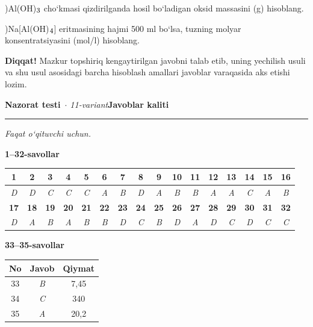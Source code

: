\documentclass[11pt,a4paper]{article}
\renewcommand{\textsubscript}[1]{\ensuremath{_{\text{\fontsize{8}{8}\selectfont #1}}}}
\newcommand{\diqqat}[1]{\par\smallskip\noindent\textbf{Diqqat!} #1\par\medskip}
\begin{document}
)Al(OH)\textsubscript{3} cho`kmasi qizdirilganda hosil bo`ladigan oksid massasini (g) hisoblang.\par
{})Na[Al(OH)\textsubscript{4}] eritmasining hajmi 500 ml bo`lsa, tuzning molyar konsentratsiyasini (mol/l) hisoblang.\par
\diqqat{Mazkur topshiriq kengaytirilgan javobni talab etib, uning yechilish usuli va shu usul asosidagi barcha hisoblash amallari javoblar varaqasida aks etishi lozim.}
\newpage
\noindent\textbf{\fontsize{13}{15}\selectfont Nazorat testi}\ \textit{$\cdot$ 11-variant}\hfill \textbf{Javoblar kaliti}\par\smallskip\hrule\smallskip
\textit{Faqat o`qituvchi uchun.}\par\medskip
\noindent\textbf{1--32-savollar}\par\smallskip
\noindent\begin{tabular}{|c|c|c|c|c|c|c|c|c|c|c|c|c|c|c|c|}\hline
\textbf{1} & \textbf{2} & \textbf{3} & \textbf{4} & \textbf{5} & \textbf{6} & \textbf{7} & \textbf{8} & \textbf{9} & \textbf{10} & \textbf{11} & \textbf{12} & \textbf{13} & \textbf{14} & \textbf{15} & \textbf{16}\\\hline
\textsl{D} & \textsl{D} & \textsl{C} & \textsl{C} & \textsl{C} & \textsl{A} & \textsl{B} & \textsl{D} & \textsl{A} & \textsl{B} & \textsl{B} & \textsl{A} & \textsl{A} & \textsl{C} & \textsl{A} & \textsl{B}\\\hline
\textbf{17} & \textbf{18} & \textbf{19} & \textbf{20} & \textbf{21} & \textbf{22} & \textbf{23} & \textbf{24} & \textbf{25} & \textbf{26} & \textbf{27} & \textbf{28} & \textbf{29} & \textbf{30} & \textbf{31} & \textbf{32}\\\hline
\textsl{D} & \textsl{A} & \textsl{B} & \textsl{A} & \textsl{B} & \textsl{B} & \textsl{D} & \textsl{C} & \textsl{B} & \textsl{D} & \textsl{A} & \textsl{D} & \textsl{C} & \textsl{D} & \textsl{C} & \textsl{C}\\\hline
\end{tabular}\par\medskip
\noindent\textbf{33--35-savollar}\par\smallskip
\noindent\begin{tabular}{|c|c|c|}\hline \textbf{No} & \textbf{Javob} & \textbf{Qiymat}\\\hline
33 & \textsl{B} & 7,45\\\hline
34 & \textsl{C} & 340\\\hline
35 & \textsl{A} & 20,2\\\hline
\end{tabular}\par\medskip
\end{document}
